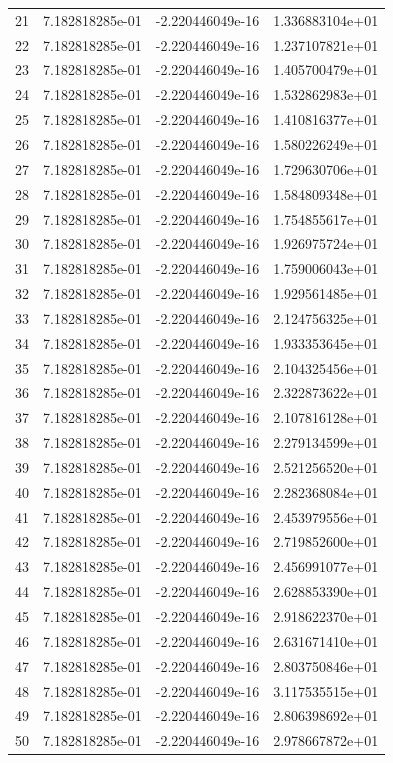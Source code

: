 \documentclass{article}
\begin{document}
\begin{table}[htb]
\begin{tabular}{c c c c}
21 & 7.182818285e-01 & -2.220446049e-16 & 1.336883104e+01 \\
22 & 7.182818285e-01 & -2.220446049e-16 & 1.237107821e+01 \\
23 & 7.182818285e-01 & -2.220446049e-16 & 1.405700479e+01 \\
24 & 7.182818285e-01 & -2.220446049e-16 & 1.532862983e+01 \\
25 & 7.182818285e-01 & -2.220446049e-16 & 1.410816377e+01 \\
26 & 7.182818285e-01 & -2.220446049e-16 & 1.580226249e+01 \\
27 & 7.182818285e-01 & -2.220446049e-16 & 1.729630706e+01 \\
28 & 7.182818285e-01 & -2.220446049e-16 & 1.584809348e+01 \\
29 & 7.182818285e-01 & -2.220446049e-16 & 1.754855617e+01 \\
30 & 7.182818285e-01 & -2.220446049e-16 & 1.926975724e+01 \\
31 & 7.182818285e-01 & -2.220446049e-16 & 1.759006043e+01 \\
32 & 7.182818285e-01 & -2.220446049e-16 & 1.929561485e+01 \\
33 & 7.182818285e-01 & -2.220446049e-16 & 2.124756325e+01 \\
34 & 7.182818285e-01 & -2.220446049e-16 & 1.933353645e+01 \\
35 & 7.182818285e-01 & -2.220446049e-16 & 2.104325456e+01 \\
36 & 7.182818285e-01 & -2.220446049e-16 & 2.322873622e+01 \\
37 & 7.182818285e-01 & -2.220446049e-16 & 2.107816128e+01 \\
38 & 7.182818285e-01 & -2.220446049e-16 & 2.279134599e+01 \\
39 & 7.182818285e-01 & -2.220446049e-16 & 2.521256520e+01 \\
40 & 7.182818285e-01 & -2.220446049e-16 & 2.282368084e+01 \\
41 & 7.182818285e-01 & -2.220446049e-16 & 2.453979556e+01 \\
42 & 7.182818285e-01 & -2.220446049e-16 & 2.719852600e+01 \\
43 & 7.182818285e-01 & -2.220446049e-16 & 2.456991077e+01 \\
44 & 7.182818285e-01 & -2.220446049e-16 & 2.628853390e+01 \\
45 & 7.182818285e-01 & -2.220446049e-16 & 2.918622370e+01 \\
46 & 7.182818285e-01 & -2.220446049e-16 & 2.631671410e+01 \\
47 & 7.182818285e-01 & -2.220446049e-16 & 2.803750846e+01 \\
48 & 7.182818285e-01 & -2.220446049e-16 & 3.117535515e+01 \\
49 & 7.182818285e-01 & -2.220446049e-16 & 2.806398692e+01 \\
50 & 7.182818285e-01 & -2.220446049e-16 & 2.978667872e+01 \\\hline %
\end{tabular}
\end{table}
\end{document}
